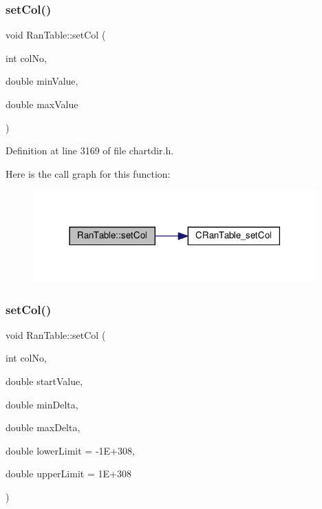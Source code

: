 \subsubsection{\texorpdfstring{set\+Col()}{setCol()}\hspace{0.1cm}{\footnotesize\ttfamily [1/2]}}
{\footnotesize\ttfamily void Ran\+Table\+::set\+Col (\begin{DoxyParamCaption}\item[{int}]{col\+No,  }\item[{double}]{min\+Value,  }\item[{double}]{max\+Value }\end{DoxyParamCaption})\hspace{0.3cm}{\ttfamily [inline]}}



Definition at line 3169 of file chartdir.\+h.

Here is the call graph for this function\+:
\nopagebreak
\begin{figure}[H]
\begin{center}
\leavevmode
\includegraphics[width=309pt]{class_ran_table_a5f1d2400ce4a5c3c2d221cf04e27982c_cgraph}
\end{center}
\end{figure}
\mbox{\label{class_ran_table_a7d3124584c2fec6e029e1fc23771570f}} 
\subsubsection{\texorpdfstring{set\+Col()}{setCol()}\hspace{0.1cm}{\footnotesize\ttfamily [2/2]}}
{\footnotesize\ttfamily void Ran\+Table\+::set\+Col (\begin{DoxyParamCaption}\item[{int}]{col\+No,  }\item[{double}]{start\+Value,  }\item[{double}]{min\+Delta,  }\item[{double}]{max\+Delta,  }\item[{double}]{lower\+Limit = {\ttfamily -\/1E+308},  }\item[{double}]{upper\+Limit = {\ttfamily 1E+308} }\end{DoxyParamCaption})\hspace{0.3cm}{\ttfamily [inline]}}



